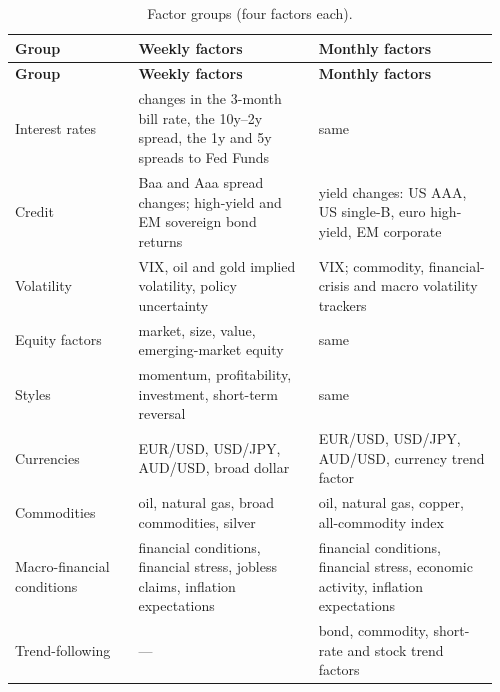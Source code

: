 {\scriptsize\setlength{\tabcolsep}{4pt}\renewcommand{\arraystretch}{1.2}
\begin{longtable}{@{}>{\raggedright\arraybackslash}p{0.247\linewidth}>{\raggedright\arraybackslash}p{0.355\linewidth}>{\raggedright\arraybackslash}p{0.359\linewidth}@{}}
\caption{Factor groups (four factors each).}\label{tab:A2}\\
\toprule
\textbf{Group} & \textbf{Weekly factors} & \textbf{Monthly factors} \\
\midrule
\endfirsthead
\toprule
\textbf{Group} & \textbf{Weekly factors} & \textbf{Monthly factors} \\
\midrule
\endhead
\bottomrule
\endlastfoot
Interest rates & changes in the 3-month bill rate, the 10y--2y spread, the 1y and 5y spreads to Fed Funds & same \\
Credit & Baa and Aaa spread changes; high-yield and EM sovereign bond returns & yield changes: US AAA, US single-B, euro high-yield, EM corporate \\
Volatility & VIX, oil and gold implied volatility, policy uncertainty & VIX; commodity, financial-crisis and macro volatility trackers \\
Equity factors & market, size, value, emerging-market equity & same \\
Styles & momentum, profitability, investment, short-term reversal & same \\
Currencies & EUR/USD, USD/JPY, AUD/USD, broad dollar & EUR/USD, USD/JPY, AUD/USD, currency trend factor \\
Commodities & oil, natural gas, broad commodities, silver & oil, natural gas, copper, all-commodity index \\
Macro-financial conditions & financial conditions, financial stress, jobless claims, inflation expectations & financial conditions, financial stress, economic activity, inflation expectations \\
Trend-following & --- & bond, commodity, short-rate and stock trend factors \\
\end{longtable}}
